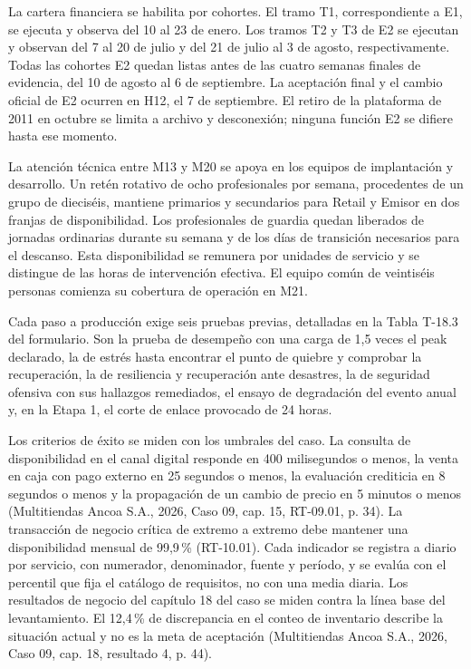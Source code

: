 \documentclass[11pt]{article}
\begin{document}
La cartera financiera se habilita por cohortes. El tramo T1, correspondiente a E1, se ejecuta y observa del 10 al 23 de enero. Los tramos T2 y T3 de E2 se ejecutan y observan del 7 al 20 de julio y del 21 de julio al 3 de agosto, respectivamente. Todas las cohortes E2 quedan listas antes de las cuatro semanas finales de evidencia, del 10 de agosto al 6 de septiembre. La aceptación final y el cambio oficial de E2 ocurren en H12, el 7 de septiembre. El retiro de la plataforma de 2011 en octubre se limita a archivo y desconexión; ninguna función E2 se difiere hasta ese momento.

La atención técnica entre M13 y M20 se apoya en los equipos de implantación y desarrollo. Un retén rotativo de ocho profesionales por semana, procedentes de un grupo de dieciséis, mantiene primarios y secundarios para Retail y Emisor en dos franjas de disponibilidad. Los profesionales de guardia quedan liberados de jornadas ordinarias durante su semana y de los días de transición necesarios para el descanso. Esta disponibilidad se remunera por unidades de servicio y se distingue de las horas de intervención efectiva. El equipo común de veintiséis personas comienza su cobertura de operación en M21.

Cada paso a producción exige seis pruebas previas, detalladas en la Tabla T-18.3 del formulario. Son la prueba de desempeño con una carga de 1,5 veces el peak declarado, la de estrés hasta encontrar el punto de quiebre y comprobar la recuperación, la de resiliencia y recuperación ante desastres, la de seguridad ofensiva con sus hallazgos remediados, el ensayo de degradación del evento anual y, en la Etapa 1, el corte de enlace provocado de 24 horas.

Los criterios de éxito se miden con los umbrales del caso. La consulta de disponibilidad en el canal digital responde en 400 milisegundos o menos, la venta en caja con pago externo en 25 segundos o menos, la evaluación crediticia en 8 segundos o menos y la propagación de un cambio de precio en 5 minutos o menos (Multitiendas Ancoa S.A., 2026, Caso 09, cap. 15, RT-09.01, p. 34). La transacción de negocio crítica de extremo a extremo debe mantener una disponibilidad mensual de 99,9\,\% (RT-10.01). Cada indicador se registra a diario por servicio, con numerador, denominador, fuente y período, y se evalúa con el percentil que fija el catálogo de requisitos, no con una media diaria. Los resultados de negocio del capítulo 18 del caso se miden contra la línea base del levantamiento. El 12,4\,\% de discrepancia en el conteo de inventario describe la situación actual y no es la meta de aceptación (Multitiendas Ancoa S.A., 2026, Caso 09, cap. 18, resultado 4, p. 44).
\end{document}
